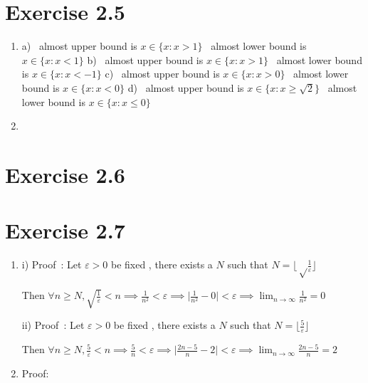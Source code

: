 \documentclass{article}
\begin{document}
\section{Exercise 2.5}
\begin{enumerate}
	\item \subitem a)   \ almost upper bound is  $x\in	\{  x:x>1	\}$
						\ almost lower bound is  $x\in	\{  x:x<1	\}$
	\subitem  b)   \ almost upper bound is  $	x \in \{ x:x>1	\}$
			     	\ almost lower bound is  $	x \in \{ x:x<-1	\}$
	\subitem  c)   \ almost upper bound is  $x	\in \{ x:x>0	\}$
					\ almost lower bound is  $x	\in \{ x:x<0	\}$ 
	\subitem  d)   \ almost upper bound is  $x	\in \{  x:x\geq \sqrt{2}\}$
				\ almost lower bound is  $	x	\in \{  x:x\leq0	\}$ 
	\item  


\end{enumerate}

\section{Exercise 2.6}
\section{Exercise 2.7}
\begin{enumerate}
	\item i) Proof\ : Let $\varepsilon >0$ be fixed , there exists a $N$ such that $N=\lfloor \sqrt\frac{1}{\varepsilon} \rfloor$ 
	
	Then $\forall n\geq N , \sqrt{\frac{1}{\varepsilon}}<n \implies \frac{1}{n^2}<\varepsilon \implies \vert\frac{1}{n^2}-0 \vert <\varepsilon \implies \lim_{n\to\infty}  \frac{1}{n^2}=0	$
	
 ii) Proof\ : Let $\varepsilon >0$ be fixed , there exists a $N$ such that $N=\lfloor \frac{5}{\varepsilon} \rfloor$ 

Then $\forall n\geq N , \frac{5}{\varepsilon}<n \implies \frac{5}{n}<\varepsilon \implies \vert\frac{2n-5}{n}-2 \vert <\varepsilon \implies \lim_{n\to\infty}  \frac{2n-5}{n}=2	$

\item Proof:
\end{enumerate}
\end{document}
